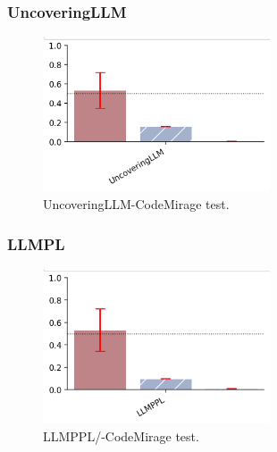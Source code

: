 \subsubsection{UncoveringLLM}
\begin{figure}[H]
    \centering
    \includegraphics[width=0.6\textwidth]{img/UncoveringLLM/AIG.png}
    \caption{UncoveringLLM-CodeMirage test.}
    \label{fig:UncoveringLLM-AIGCode test}
\end{figure}



\subsubsection{LLMPL}
\begin{figure}[H]
    \centering
    \includegraphics[width=0.6\textwidth]{img/LLMPPL/AIG.png}
    \caption{LLMPPL/-CodeMirage test.}
    \label{fig:LLMPPL-AIGCode test}
\end{figure}

